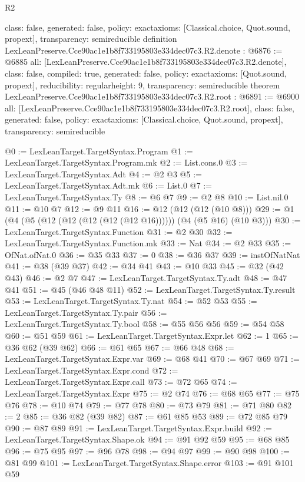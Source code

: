 \begin{lexlean}{R2}
\begin{coremodule}
{  class: false,
  generated: false,
  policy: exact{axioms: [Classical.choice, Quot.sound, propext]},
  transparency: semireducible
}
definition LexLeanPreserve.Cce90ac1e1b8f733195803e334dec07c3.R2.denote : @6876 := @6885 {
  all: [LexLeanPreserve.Cce90ac1e1b8f733195803e334dec07c3.R2.denote],
  class: false,
  compiled: true,
  generated: false,
  policy: exact{axioms: [Quot.sound, propext]},
  reducibility: regular{height: 9},
  transparency: semireducible
}
theorem LexLeanPreserve.Cce90ac1e1b8f733195803e334dec07c3.R2.root : @6891 := @6900 {
  all: [LexLeanPreserve.Cce90ac1e1b8f733195803e334dec07c3.R2.root],
  class: false,
  generated: false,
  policy: exact{axioms: [Classical.choice, Quot.sound, propext]},
  transparency: semireducible
}

@0 := LexLeanTarget.TargetSyntax.Program
@1 := LexLeanTarget.TargetSyntax.Program.mk
@2 := List.cons.{0}
@3 := LexLeanTarget.TargetSyntax.Adt
@4 := @2 @3
@5 := LexLeanTarget.TargetSyntax.Adt.mk
@6 := List.{0}
@7 := LexLeanTarget.TargetSyntax.Ty
@8 := @6 @7
@9 := @2 @8
@10 := List.nil.{0}
@11 := @10 @7
@12 := @9 @11
@16 := @12 (@12 (@12 (@10 @8)))
@29 := @1 (@4 (@5 (@12 (@12 (@12 (@12 (@12 @16)))))) (@4 (@5 @16) (@10 @3)))
@30 := LexLeanTarget.TargetSyntax.Function
@31 := @2 @30
@32 := LexLeanTarget.TargetSyntax.Function.mk
@33 := Nat
@34 := @2 @33
@35 := OfNat.ofNat.{0}
@36 := @35 @33
@37 := 0
@38 := @36 @37
@39 := instOfNatNat
@41 := @38 (@39 @37)
@42 := @34 @41
@43 := @10 @33
@45 := @32 (@42 @43)
@46 := @2 @7
@47 := LexLeanTarget.TargetSyntax.Ty.adt
@48 := @47 @41
@51 := @45 (@46 @48 @11)
@52 := LexLeanTarget.TargetSyntax.Ty.result
@53 := LexLeanTarget.TargetSyntax.Ty.nat
@54 := @52 @53
@55 := LexLeanTarget.TargetSyntax.Ty.pair
@56 := LexLeanTarget.TargetSyntax.Ty.bool
@58 := @55 @56 @56
@59 := @54 @58
@60 := @51 @59
@61 := LexLeanTarget.TargetSyntax.Expr.let
@62 := 1
@65 := @36 @62 (@39 @62)
@66 := @61 @65
@67 := @66 @48
@68 := LexLeanTarget.TargetSyntax.Expr.var
@69 := @68 @41
@70 := @67 @69
@71 := LexLeanTarget.TargetSyntax.Expr.cond
@72 := LexLeanTarget.TargetSyntax.Expr.call
@73 := @72 @65
@74 := LexLeanTarget.TargetSyntax.Expr
@75 := @2 @74
@76 := @68 @65
@77 := @75 @76
@78 := @10 @74
@79 := @77 @78
@80 := @73 @79
@81 := @71 @80
@82 := 2
@85 := @36 @82 (@39 @82)
@87 := @61 @85 @53
@89 := @72 @85 @79
@90 := @87 @89
@91 := LexLeanTarget.TargetSyntax.Expr.build
@92 := LexLeanTarget.TargetSyntax.Shape.ok
@94 := @91 @92 @59
@95 := @68 @85
@96 := @75 @95
@97 := @96 @78
@98 := @94 @97
@99 := @90 @98
@100 := @81 @99
@101 := LexLeanTarget.TargetSyntax.Shape.error
@103 := @91 @101 @59

\end{coremodule}
\end{lexlean}
